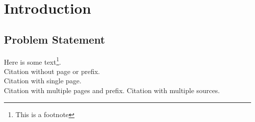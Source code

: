 \section{Introduction}
\label{sec:Introduction}
\subsection{Problem Statement}
\label{subsec:ProblemStatement}
Here is some text\footnote{This is a footnote}.\\
Citation without page or prefix.\autocite{Ihaka.1996}\\
Citation with single page.\autocite[299]{Ihaka.1996}\\
Citation with multiple pages and prefix.\autocite[cf.][299-301, 303, 305-307]{Ihaka.1996}
Citation with multiple sources.\autocites[cf.][299-301, 303, 305-307]{Ihaka.1996}[299]{Ihaka.1996}[cf.][]{Ihaka.1996}
